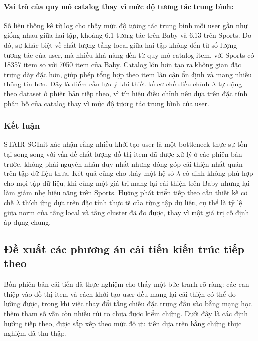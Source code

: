 \begin{longtable}
\paragraph{Vai trò của quy mô catalog thay vì mức độ tương tác trung bình:}
Số liệu thống kê từ log cho thấy mức độ tương tác trung bình mỗi user gần như giống nhau giữa hai tập, khoảng 6.1 tương tác trên Baby và 6.13 trên Sports. Do đó, sự khác biệt về chất lượng tầng local giữa hai tập không đến từ số lượng tương tác của user, mà nhiều khả năng đến từ quy mô catalog item, với Sports có 18357 item so với 7050 item của Baby. Catalog lớn hơn tạo ra không gian đặc trưng dày đặc hơn, giúp phép tổng hợp theo item lân cận ổn định và mang nhiều thông tin hơn. Đây là điểm cần lưu ý khi thiết kế cơ chế điều chỉnh $\lambda$ tự động theo dataset ở phiên bản tiếp theo, vì tín hiệu điều chỉnh nên dựa trên đặc tính phân bố của catalog thay vì mức độ tương tác trung bình của user.
 
\subsubsection{Kết luận}
 
STAIR-SGInit xác nhận rằng nhiễu khởi tạo user là một bottleneck thực sự tồn tại song song với vấn đề chất lượng đồ thị item đã được xử lý ở các phiên bản trước, không phải nguyên nhân duy nhất nhưng đóng góp cải thiện nhất quán trên tập dữ liệu thưa. Kết quả cũng cho thấy một hệ số $\lambda$ cố định không phù hợp cho mọi tập dữ liệu, khi cùng một giá trị mang lại cải thiện trên Baby nhưng lại làm giảm nhẹ hiệu năng trên Sports. Hướng phát triển tiếp theo cần thiết kế cơ chế $\lambda$ thích ứng dựa trên đặc tính thực tế của từng tập dữ liệu, cụ thể là tỷ lệ giữa norm của tầng local và tầng cluster đã đo được, thay vì một giá trị cố định áp dụng chung.
 
 
 
 
\subsection{Đề xuất các phương án cải tiến kiến trúc tiếp theo}
 
Bốn phiên bản cải tiến đã thực nghiệm cho thấy một bức tranh rõ ràng: các can thiệp vào đồ thị item và cách khởi tạo user đều mang lại cải thiện có thể đo lường được, trong khi việc thay đổi tầng chiếu đặc trưng đầu vào bằng mạng học thêm tham số vẫn còn nhiều rủi ro chưa được kiểm chứng. Dưới đây là các định hướng tiếp theo, được sắp xếp theo mức độ ưu tiên dựa trên bằng chứng thực nghiệm đã thu thập.
 

\end{longtable}
